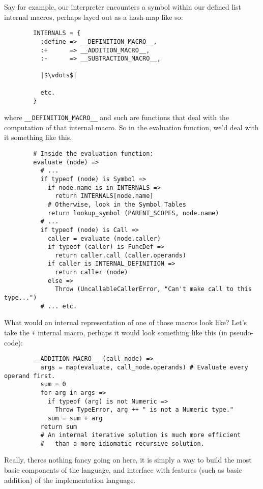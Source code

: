 \documentclass{article}
\newcommand{\code}[1]{\texttt{#1}}
\begin{document}
      Say for example, our interpreter encounters a symbol within our defined
      list internal macros, perhaps layed out as a hash-map like so:
      \begin{verbatim}
        INTERNALS = {
          :define => __DEFINITION_MACRO__,
          :+      => __ADDITION_MACRO__,
          :-      => __SUBTRACTION_MACRO__,

          |$\vdots$|

          etc.
        }
      \end{verbatim}

      where \code{\_\_DEFINITION\_MACRO\_\_} and such are functions that deal with
      the computation of that internal macro. So in the evaluation function,
      we'd deal with it something like this.
      \begin{verbatim}
        # Inside the evaluation function:
        evaluate (node) =>
          # ...
          if typeof (node) is Symbol =>
            if node.name is in INTERNALS =>
              return INTERNALS[node.name]
            # Otherwise, look in the Symbol Tables
            return lookup_symbol (PARENT_SCOPES, node.name)
          # ...
          if typeof (node) is Call =>
            caller = evaluate (node.caller)
            if typeof (caller) is FuncDef =>
              return caller.call (caller.operands)
            if caller is INTERNAL_DEFINITION =>
              return caller (node)
            else =>
              Throw (UncallableCallerError, "Can't make call to this type...")
          # ... etc.
      \end{verbatim}
      \clearpage
      What would an internal representation of one of those macros look like?
      Let's take the \code{+} internal macro, perhaps it would look something
      like this (in pseudo-code):
      \begin{verbatim}
        __ADDITION_MACRO__ (call_node) =>
          args = map(evaluate, call_node.operands) # Evaluate every operand first.
          sum = 0
          for arg in args =>
            if typeof (arg) is not Numeric =>
              Throw TypeError, arg ++ " is not a Numeric type."
            sum = sum + arg
          return sum
          # An internal iterative solution is much more efficient
          #   than a more idiomatic recursive solution.
      \end{verbatim}
      Really, theres nothing fancy going on here, it is simply a way to build
      the most basic components of the language, and interface with features
      (such as basic addition) of the implementation language.
\end{document}
